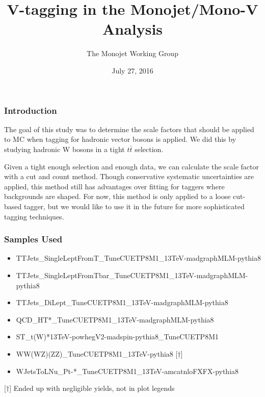 \documentclass{beamer}
\author[D. Abercrombie]{
  The Monojet Working Group
}
\title{\bf \sffamily V-tagging in the Monojet/Mono-V Analysis}
\date{July 27, 2016}
\begin{document}
\begin{frame}[nonumbering]
  \titlepage
\end{frame}

\begin{frame}
  \frametitle{Introduction}
  The goal of this study was to determine the scale factors that should
  be applied to MC when tagging for hadronic vector bosons is applied.
  We did this by studying hadronic W bosons in a tight $t\bar{t}$ selection.

  \vspace{12pt}

  Given a tight enough selection and enough data, we can calculate the 
  scale factor with a cut and count method.
  Though conservative systematic uncertainties are applied, this method still has advantages
  over fitting for taggers where backgrounds are shaped.
  For now, this method is only applied to a loose cut-based tagger,
  but we would like to use it in the future for more sophisticated tagging techniques.
\end{frame}

\begin{frame}
  \frametitle{Samples Used}
  \begin{itemize}
  \item TTJets\_SingleLeptFromT\_TuneCUETP8M1\_13TeV-madgraphMLM-pythia8
  \item TTJets\_SingleLeptFromTbar\_TuneCUETP8M1\_13TeV-madgraphMLM-pythia8
  \item TTJets\_DiLept\_TuneCUETP8M1\_13TeV-madgraphMLM-pythia8
  \item QCD\_HT*\_TuneCUETP8M1\_13TeV-madgraphMLM-pythia8
  \item ST\_t(W)*13TeV-powhegV2-madspin-pythia8\_TuneCUETP8M1
  \item WW(WZ)(ZZ)\_TuneCUETP8M1\_13TeV-pythia8 [$\dagger$]
  \item WJetsToLNu\_Pt-*\_TuneCUETP8M1\_13TeV-amcatnloFXFX-pythia8
  \end{itemize}
  [$\dagger$] Ended up with negligible yields, not in plot legends
\end{frame}
\end{document}
